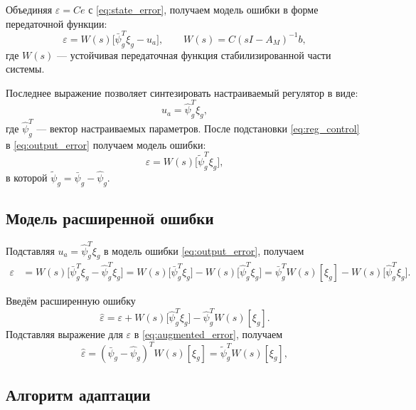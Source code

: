 Объединяя $\varepsilon=Ce$ с \eqref{eq:state_error}, получаем
модель ошибки в форме передаточной функции:
\begin{equation}
    \varepsilon=W(s)\bigl[\bar{\psi}_g^T\xi_g-u_a\bigr],
    \qquad
    W(s)=C(sI-A_M)^{-1}b,
    \label{eq:output_error}
\end{equation}
где $W(s)$ --- устойчивая передаточная функция
стабилизированной части системы.

Последнее выражение позволяет синтезировать настраиваемый регулятор в виде:
\begin{equation}
    u_a=\hat{\psi}^T_g\xi_g,
    \label{eq:reg_control}
\end{equation}
где $\hat{\psi}^T_g$ --- вектор настраиваемых параметров. После подстановки
\eqref{eq:reg_control} в \eqref{eq:output_error} получаем модель ошибки:
\begin{equation}
    \varepsilon=W(s)\bigl[\tilde{\psi}_g^T\xi_g\bigr],
\end{equation}
в которой $\tilde{\psi}_g=\bar{\psi}_g-\hat{\psi}_g$.

\subsection{Модель расширенной ошибки}

Подставляя $u_a=\hat{\psi}_g^T\xi_g$ в модель ошибки
\eqref{eq:output_error}, получаем
\begin{align*}
    \varepsilon
    &= W(s)\bigl[\bar{\psi}_g^T\xi_g-\hat{\psi}_g^T\xi_g\bigr]= W(s)\bigl[\bar{\psi}_g^T\xi_g\bigr]
       -W(s)\bigl[\hat{\psi}_g^T\xi_g\bigr]= \bar{\psi}_g^T W(s)[\xi_g]
       -W(s)\bigl[\hat{\psi}_g^T\xi_g\bigr].
\end{align*}

Введём расширенную ошибку
\begin{equation}
    \hat{\varepsilon}
    = \varepsilon
      +W(s)\bigl[\hat{\psi}_g^T\xi_g\bigr]
      -\hat{\psi}_g^T W(s)[\xi_g].
    \label{eq:augmented_error}
\end{equation}
Подставляя выражение для $\varepsilon$ в
\eqref{eq:augmented_error}, получаем
\begin{equation}
    \hat{\varepsilon}
    =(\bar{\psi}_g-\hat{\psi}_g)^T W(s)[\xi_g]
    =\tilde{\psi}_g^T W(s)[\xi_g],
    \label{eq:augmented_error_model}
\end{equation}

\subsection{Алгоритм адаптации}

